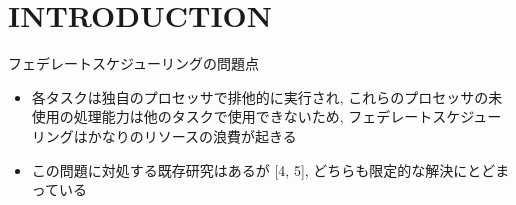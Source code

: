 
\section{INTRODUCTION}
\label{sec: introduction}



\begin{frame}{フェデレートスケジューリングの問題点}
    \begin{itemize}
        \item 各タスクは独自のプロセッサで排他的に実行され, これらのプロセッサの未使用の処理能力は他のタスクで使用できないため, フェデレートスケジューリングはかなりのリソースの浪費が起きる
        \item この問題に対処する既存研究はあるが [4, 5], どちらも限定的な解決にとどまっている
    \end{itemize}
\end{frame}


